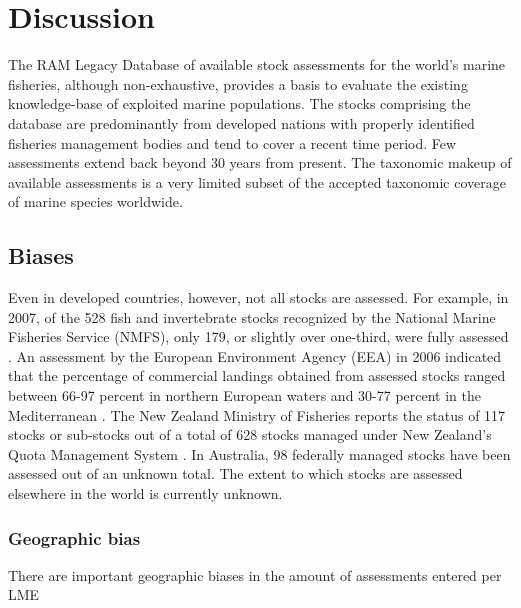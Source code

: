 \documentclass[letterpaper,review,authoryear,12pt]{elsarticle}
\begin{document}



\newpage
\section*{Discussion}

The RAM Legacy Database of available stock assessments for the world's
marine fisheries, although non-exhaustive, provides a basis to
evaluate the existing knowledge-base of exploited marine populations.
The stocks comprising the database are predominantly from developed
nations with properly identified fisheries management bodies and tend
to cover a recent time period. Few assessments extend back beyond 30
years from present. The taxonomic makeup of available assessments is a
very limited subset of the accepted taxonomic coverage of marine
species worldwide.

\subsection*{Biases}

Even in developed countries, however, not all stocks are assessed.
For example, in 2007, of the 528 fish and invertebrate stocks
recognized by the National Marine Fisheries Service (NMFS), only 179,
or slightly over one-third, were fully assessed
\citep{NMFS:2008:status}.  An assessment by the European Environment
Agency (EEA) in 2006 indicated that the percentage of commercial
landings obtained from assessed stocks ranged between 66-97 percent in
northern European waters and 30-77 percent in the Mediterranean
\citep{eea:2009:status}.  The New Zealand Ministry of Fisheries
reports the status of 117 stocks or sub-stocks out of a total of 628
stocks managed under New Zealand's Quota Management System
\citep{NZMF:2009}.  In Australia, 98 federally managed stocks have
been assessed \citep{Wilson:etal:2009:status} out of an unknown total.
The extent to which stocks are assessed elsewhere in the world is
currently unknown.


\subsubsection*{Geographic bias}

There are important geographic biases in the amount of assessments entered per LME
\end{document}
